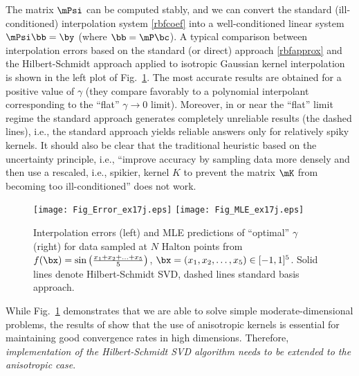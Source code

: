 The matrix $\mPsi$ can be computed stably, and we can convert the standard (ill-conditioned) interpolation system \eqref{rbfcoef} into a well-conditioned linear system $\mPsi \bb = \by$ (where $\bb=\mP\bc$). A typical comparison between interpolation errors based on the standard (or direct) approach \eqref{rbfapprox} and the Hilbert-Schmidt approach applied to isotropic Gaussian kernel interpolation is shown in the left plot of Fig.~\ref{Fig_HSSVD}. The most accurate results are obtained for a positive value of $\gamma$ (they compare favorably to a polynomial interpolant corresponding to the ``flat'' $\gamma\to0$ limit). Moreover, in or near the ``flat'' limit regime the standard approach generates completely unreliable results (the dashed lines), i.e., the standard approach yields reliable answers only for relatively spiky kernels. It should also be clear that the traditional heuristic based on the uncertainty principle, i.e., ``improve accuracy by sampling data more densely and then use a rescaled, i.e., spikier, kernel $K$ to prevent the matrix $\mK$ from becoming too ill-conditioned'' does not work.

\begin{figure}[h]
    \centering
    \texttt{[image: Fig\_Error\_ex17j.eps]}
    \texttt{[image: Fig\_MLE\_ex17j.eps]}
\caption{Interpolation errors (left) and MLE predictions of ``optimal'' $\gamma$ (right) for data sampled at $N$ Halton points from $f(\bx) = \sin\left(\tfrac{x_1+x_2+\ldots+x_5}{5}\right)$, $\bx=(x_1,x_2,\ldots,x_5) \in [-1,1]^5$. Solid lines denote Hilbert-Schmidt SVD, dashed lines standard basis approach.}\label{Fig_HSSVD}
\end{figure}

While Fig.~\ref{Fig_HSSVD} demonstrates that we are able to solve simple moderate-dimensional problems, the results of \cite{FasHicWoz12b, FasHicWoz12a} show that the use of anisotropic kernels is essential for maintaining good convergence rates in high dimensions. Therefore, \emph{implementation of the Hilbert-Schmidt SVD algorithm needs to be extended to the anisotropic case}.

